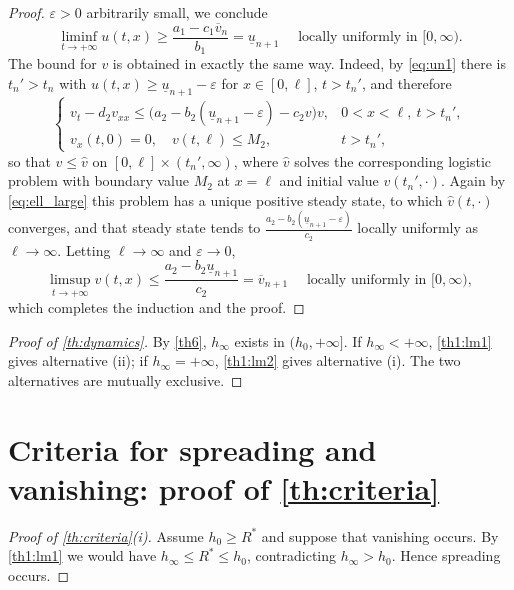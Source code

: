 \documentclass[reqno]{amsart}
\theoremstyle{plain}
\theoremstyle{definition}
\theoremstyle{remark}
\begin{document}
\begin{proof}
	$\varepsilon>0$ arbitrarily small, we conclude
	\begin{equation}\label{eq:un1}
		\liminf_{t \to +\infty}{u(t,x)} \ge \frac{a_1-c_1\overline{v}_n}{b_1} = \underline{u}_{n+1}
		\quad\text{ locally uniformly in }[0,\infty).
	\end{equation}
	The bound for $v$ is obtained in exactly the same way. Indeed, by
	\eqref{eq:un1} there is $t_n'>t_n$ with
	$u(t,x)\ge\underline{u}_{n+1}-\varepsilon$ for $x\in[0,\ell]$, $t>t_n'$, and
	therefore
	\[
	\begin{cases}
		v_t - d_2v_{xx} \le \big(a_2 - b_2(\underline{u}_{n+1}-\varepsilon) - c_2 v\big) v , & 0 < x< \ell, ~ t > t_n',\\
		v_x(t, 0) = 0, \quad v(t, \ell) \le M_2, & t > t_n' ,
	\end{cases}
	\]
	so that $v\le\hat v$ on $[0,\ell]\times(t_n',\infty)$, where $\hat v$ solves
	the corresponding logistic problem with boundary value $M_2$ at $x=\ell$ and
	initial value $v(t_n',\cdot)$. Again by \eqref{eq:ell_large} this problem has a
	unique positive steady state, to which $\hat v(t,\cdot)$ converges, and that
	steady state tends to $\frac{a_2-b_2(\underline u_{n+1}-\varepsilon)}{c_2}$
	locally uniformly as $\ell\to\infty$. Letting $\ell\to\infty$ and
	$\varepsilon\to0$,
	\[
	\limsup_{t \to +\infty}{v(t,x)} \le \frac{a_2-b_2\underline{u}_{n+1}}{c_2} = \overline{v}_{n+1}
	\quad\text{ locally uniformly in }[0,\infty),
	\]
	which completes the induction and the proof.
\end{proof}

\begin{proof}[Proof of \cref{th:dynamics}]
	By \cref{th6}, $h_\infty$ exists in $(h_0,+\infty]$. If $h_\infty<+\infty$,
	\cref{th1:lm1} gives alternative (ii); if $h_\infty=+\infty$,
	\cref{th1:lm2} gives alternative (i). The two alternatives are mutually
	exclusive.
\end{proof}

\section{Criteria for spreading and vanishing: proof of \texorpdfstring{\cref{th:criteria}}{the criteria theorem}}\label{sec_4}

\begin{proof}[Proof of \cref{th:criteria}(i)]
	Assume $h_0\ge R^*$ and suppose that vanishing occurs. By \cref{th1:lm1} we
	would have $h_\infty\le R^*\le h_0$, contradicting $h_\infty>h_0$. Hence
	spreading occurs.
\end{proof}
\end{document}
